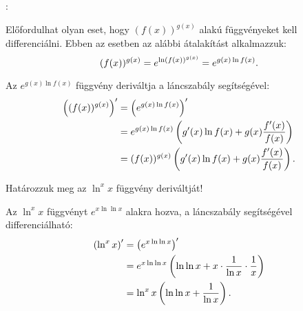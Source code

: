 \documentclass[a4paper, 12pt]{scrartcl}
\begin{document}


\clearpage

\begin{blueBox}
  :

  Előfordulhat olyan eset, hogy $(f(x))^{g(x)}$ alakú függvényeket kell
  differenciálni. Ebben az esetben az alábbi átalakítást alkalmazzuk:
  \[
    (f(x))^{g(x)} = e^{\ln (f(x))^{g(x)}} = e^{g(x) \ln f(x)}
    \text.
  \]

  Az $e^{g(x) \ln f(x)}$ függvény deriváltja a láncszabály segítségével:
  \begin{align*}
    \left((f(x))^{g(x)}\right)'
     & =\left(e^{g(x) \ln f(x)}\right)'                                            \\
     & = e^{g(x) \ln f(x)} \left( g'(x) \ln f(x) + g(x) \frac{f'(x)}{f(x)} \right) \\
     & = (f(x))^{g(x)} \left( g'(x) \ln f(x) + g(x) \frac{f'(x)}{f(x)} \right)
    \text.
  \end{align*}
\end{blueBox}

\begin{note}
  Határozzuk meg az $\ln^x x$ függvény deriváltját!

  Az $\ln^x x$ függvényt $e^{x \ln \ln x}$ alakra hozva, a láncszabály
  segítségével differenciálható:
  \begin{align*}
    \left(\ln^x x\right)'
     & = \left(e^{x \ln \ln x}\right)'                                                        \\
     & = e^{x \ln \ln x} \left( \ln \ln x + x \cdot \frac{1}{\ln x} \cdot \frac{1}{x} \right) \\
     & = \ln^x x \left( \ln \ln x + \frac{1}{\ln x} \right)
    \text.
  \end{align*}
\end{note}
\end{document}
